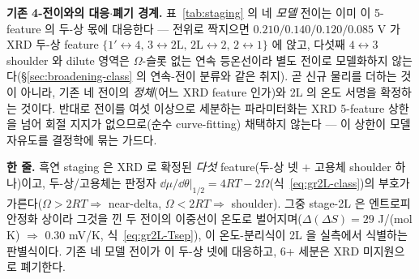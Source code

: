 \textbf{기존 4-전이와의 대응$\cdot$폐기 경계.} 표~\ref{tab:staging} 의 네 \emph{모델} 전이는 이미 이 5-feature
의 두-상 몫에 대응한다 --- 전위로 짝지으면 $0.210/0.140/0.120/0.085$ V 가 XRD 두-상 feature
$\{1'\!\leftrightarrow\!4,\,3\!\leftrightarrow\!2\mathrm L,\,2\mathrm L\!\leftrightarrow\!2,\,2\!\leftrightarrow\!1\}$
에 앉고, 다섯째 $4\!\leftrightarrow\!3$ shoulder 와 dilute 영역은 $\Omega$-슬롯 없는 연속 등온선이라 별도
전이로 모델화하지 않는다(\S\ref{sec:broadening-class} 의 연속-전이 분류와 같은 취지). 곧 신규 물리를 더하는
것이 아니라, 기존 네 전이의 \emph{정체}(어느 XRD feature 인가)와 2L 의 온도 서명을 확정하는 것이다. 반대로
전이를 여섯 이상으로 세분하는 파라미터화는 XRD 5-feature 상한을 넘어 회절 지지가 없으므로(순수 curve-fitting)
채택하지 않는다 --- 이 상한이 모델 자유도를 결정학에 묶는 가드다.
\begin{keybox}
\textbf{한 줄.} 흑연 staging 은 XRD 로 확정된 \emph{다섯} feature(두-상 넷 $+$ 고용체 shoulder
하나)이고, 두-상/고용체는 판정자 $\dd\mu/\dd\theta|_{1/2}=4RT-2\Omega$(식~\eqref{eq:gr2L-class})의 부호가
가른다($\Omega{>}2RT\Rightarrow$ near-delta, $\Omega{<}2RT\Rightarrow$ shoulder). 그중 stage-2L 은
엔트로피 안정화 상이라 그것을 낀 두 전이의 이중선이 온도로 벌어지며($\Delta(\Delta S){=}29$ J/(mol\,K)
$\Rightarrow$ $0.30$ mV/K, 식~\eqref{eq:gr2L-Tsep}), 이 온도-분리식이 2L 을 실측에서 식별하는 판별식이다.
기존 네 모델 전이가 이 두-상 넷에 대응하고, 6+ 세분은 XRD 미지원으로 폐기한다.
\end{keybox}
